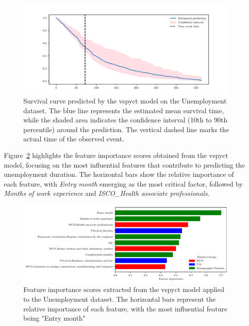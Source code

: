 \documentclass[3p,review,authoryear]{elsarticle}
\begin{document}
\begin{figure}[h!]
    \centering
    \includegraphics[width=1.0\textwidth]{pred_with_ci.pdf}
    \caption{Survival curve predicted by the \gls{vspyct} model on the Unemployment dataset. The blue line represents the estimated mean survival time, while the shaded area indicates the confidence interval (10th to 90th percentile) around the prediction. The vertical dashed line marks the actual time of the observed event.}
    \label{fig:pred_ci}
\end{figure}

Figure~\ref{fig:feature_importance} highlights the feature importance scores obtained from the \gls{vspyct} model, focusing on the most influential features that contribute to predicting the unemployment duration.
The horizontal bars show the relative importance of each feature, with \textit{Entry month} emerging as the most critical factor, followed by \textit{Months of work experience} and \textit{ISCO\_Health associate professionals}.

\begin{figure}[h!]
    \centering
    \includegraphics[width=1.0\textwidth]{feature_importance_colored.pdf}
    \caption{Feature importance scores extracted from the \gls{vspyct} model applied to the Unemployment dataset. The horizontal bars represent the relative importance of each feature, with the most influential feature being "Entry month"}
    \label{fig:feature_importance}
\end{figure}
\end{document}
